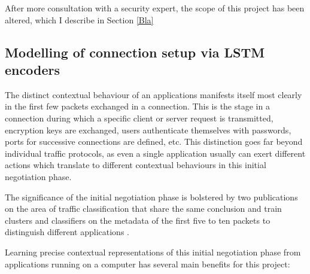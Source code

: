 \documentclass[a4paper,12pt,twoside]{article}
\begin{document}
After more consultation with a security expert, the scope of this project has been altered, which I describe in Section \ref{Bla}








\subsection{Modelling of connection setup via LSTM encoders}\label{Sec:Encoder}

The distinct contextual behaviour of an applications manifests itself most clearly in the first few packets exchanged in a connection. This is the stage in a connection during which a specific client or server request is transmitted, encryption keys are exchanged, users authenticate themselves with passwords, ports for successive connections are defined, etc. This distinction goes far beyond individual traffic protocols, as even a single application usually can exert different actions which translate to different contextual behaviours in this initial negotiation phase. 

The significance of the initial negotiation phase is bolstered by two publications on the area of traffic classification that share the same conclusion and train clusters and classifiers on the metadata of the first five to ten packets to distinguish different applications \cite{bernaille2006traffic,crotti2007traffic}.

Learning precise contextual representations of this initial negotiation phase from applications running on a computer has several main benefits for this project: 
\end{document}
